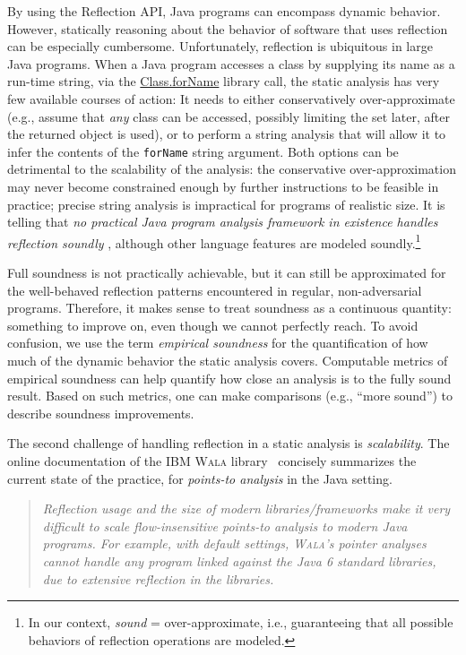 \documentclass{llncs}
\newcommand{\code}[1]{\texttt{#1}}
\newcommand{\javasignature}[1]{\url{#1}}
\begin{document}
By using the Reflection API, Java programs can encompass dynamic
behavior. However, statically reasoning about the behavior of software
that uses reflection can be especially cumbersome.  Unfortunately,
reflection is ubiquitous in large Java programs.
%
When a Java program accesses a class by supplying its name as a
run-time string, via the \javasignature{Class.forName} library call,
the static analysis has very few available courses of action: It needs
to either conservatively over-approximate (e.g., assume that
\emph{any} class can be accessed, possibly limiting the set later,
after the returned object is used), or to perform a string analysis
that will allow it to infer the contents of the \code{forName} string
argument. Both options can be detrimental to the scalability of the
analysis: the conservative over-approximation may never become
constrained enough by further instructions to be feasible in practice;
precise string analysis is impractical for programs of realistic size.
It is telling that \emph{no practical Java program analysis framework
  in existence handles reflection soundly} \cite{soundiness15},
although other language features are modeled soundly.\footnote{In our
  context, \emph{sound} = over-approximate, i.e., guaranteeing that
  all possible behaviors of reflection operations are modeled.}

%
Full soundness is not practically achievable, but it can still be
approximated for the well-behaved reflection patterns encountered in
regular, non-adversarial programs.  Therefore, it makes sense to treat
soundness as a continuous quantity: something to improve on, even
though we cannot perfectly reach.  To avoid confusion, we use the term
\emph{empirical soundness} for the quantification of how much of the
dynamic behavior the static analysis covers. Computable metrics of
empirical soundness can help quantify how close an analysis is to the
fully sound result. Based on such metrics, one can make comparisons
(e.g., ``more sound'') to describe soundness improvements.

The second challenge of handling reflection in a static analysis is
\emph{scalability}.  The online documentation of the IBM \textsc{Wala}
library~\cite{www:wala-reflection} concisely summarizes the current
state of the practice, for \emph{points-to analysis} in the Java
setting.

\begin{quote}
  \emph{Reflection usage and the size of modern libraries/frameworks
    make it very difficult to scale flow-insensitive points-to
    analysis to modern Java programs. For example, with default
    settings, \textsc{Wala}'s pointer analyses cannot handle any
    program linked against the Java 6 standard libraries, due to
    extensive reflection in the libraries.}
\end{quote}
\end{document}

